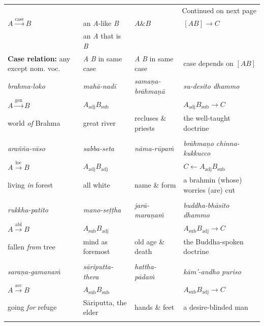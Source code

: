 \documentclass[11pt,oneside]{memoir}
\begin{document}
\begin{minipage}{\linewidth+10pt}
\begin{longtable}{llll}
\hline
\endhead
\hline\multicolumn{4}{r}{Continued on next page} \\
\endfoot
\endlastfoot
\hline
\(A \xrightarrow{\text{case}} B\) & an \emph{A}-like \emph{B} & \(A \mathbin{\&} B\) & \([A B] \rightarrow C\)\\[0pt]
 & an \emph{A} that is \emph{B} &  & \\[0pt]
\hline
\textbf{Case relation:} any except nom. voc. & \emph{A} \emph{B} in same case & \emph{A} \emph{B} in same case & case depends on \([A B]\)\\[0pt]
\hline
\hline
\emph{brahma-loko} & \emph{mahā-nadī} & \emph{samaṇa-brāhmaṇā} & \emph{su-desito dhammo}\\[0pt]
\(A \xrightarrow{\text{gen}} B\) & \(A_{\text{adj}} B_{\text{sub}}\) &  & \(A_{\text{adj}} B_{\text{sub}} \rightarrow C\)\\[0pt]
world \emph{of} Brahma & great river & recluses \& priests & the well-taught doctrine\\[0pt]
 &  &  & \\[0pt]
\hline
\emph{arañña-vāso} & \emph{sabba-seta} & \emph{nāma-rūpaṁ} & \emph{brāhmaṇo chinna-kukkucco}\\[0pt]
\(A \xrightarrow{\text{loc}} B\) & \(A_{\text{adj}} B_{\text{adj}}\) &  & \(C \leftarrow A_{\text{adj}} B_{\text{sub}}\)\\[0pt]
living \emph{in} forest & all white & name \& form & a brahmin (whose) worries (are) cut\\[0pt]
 &  &  & \\[0pt]
\hline
\emph{rukkha-patito} & \emph{mano-seṭṭha} & \emph{jarā-maraṇaṁ} & \emph{buddha-bhāsito dhammo}\\[0pt]
\(A \xrightarrow{\text{abl}} B\) & \(A_{\text{sub}} B_{\text{adj}}\) &  & \(A_{\text{sub}} B_{\text{adj}} \rightarrow C\)\\[0pt]
fallen \emph{from} tree & mind as foremost & old age \& death & the Buddha-spoken doctrine\\[0pt]
 &  &  & \\[0pt]
\hline
\emph{saraṇa-gamanaṁ} & \emph{sāriputta-thera} & \emph{hattha-pādaṁ} & \emph{kām'-andho puriso}\\[0pt]
\(A \xrightarrow{\text{acc}} B\) & \(A_{\text{sub}} B_{\text{sub}}\) &  & \(A_{\text{sub}} B_{\text{adj}} \rightarrow C\)\\[0pt]
going \emph{for} refuge & Sāriputta, the elder & hands \& feet & a desire-blinded man\\[0pt]
 &  &  & \\[0pt]

\end{longtable}
\end{minipage}
\end{document}
